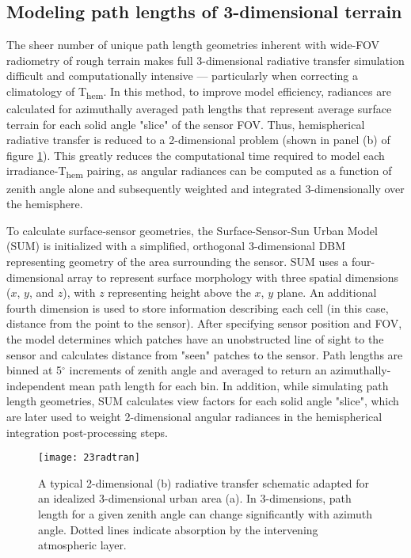 \subsection{Modeling path lengths of 3-dimensional terrain}

The sheer number of unique path length geometries inherent with wide-FOV radiometry of rough terrain makes full 3-dimensional radiative transfer simulation difficult and computationally intensive --- particularly when correcting a climatology of T\textsubscript{hem}. In this method, to improve model efficiency, radiances are calculated for azimuthally averaged path lengths that represent average surface terrain for each solid angle "slice" of the sensor FOV. Thus, hemispherical radiative transfer is reduced to a 2-dimensional problem (shown in panel (b) of figure \ref{23radtran}). This greatly reduces the computational time required to model each irradiance-T\textsubscript{hem} pairing, as angular radiances can be computed as a function of zenith angle alone and subsequently weighted and integrated 3-dimensionally over the hemisphere. 

To calculate surface-sensor geometries, the Surface-Sensor-Sun Urban Model (SUM) \cite{Soux2004} is initialized with a simplified, orthogonal 3-dimensional DBM representing geometry of the area surrounding the sensor. SUM uses a four-dimensional array to represent surface morphology   with three spatial dimensions ($x$, $y$, and $z$), with $z$ representing height above the $x$, $y$ plane. An additional fourth dimension is used to store information describing each cell (in this case, distance from the point to the sensor). After specifying sensor position and FOV, the model determines which patches have an unobstructed line of sight to the sensor and calculates distance from "seen" patches to the sensor. Path lengths are binned at 5$^{\circ}$ increments of zenith angle and averaged to return an azimuthally-independent mean path length for each bin. In addition, while simulating path length geometries, SUM calculates view factors for each solid angle "slice", which are later used to weight 2-dimensional angular radiances in the hemispherical integration post-processing steps.

\begin{figure}[!ht]
	\texttt{[image: 23radtran]}
	\label{23radtran}
	\caption{A typical 2-dimensional (b) radiative transfer schematic adapted for an idealized 3-dimensional urban area (a). In 3-dimensions, path length for a given zenith angle can change significantly with azimuth angle. Dotted lines indicate absorption by the intervening atmospheric layer.}
\end{figure}

